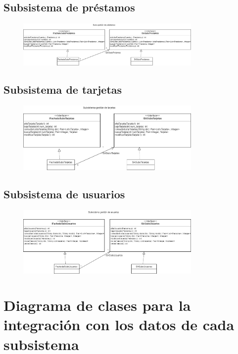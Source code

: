 \documentclass[12pt]{article}
\begin{document}
\subsection{Subsistema de préstamos}
\begin{figure}[H]
    \centering
    \includegraphics[width=0.8\textwidth]{images/SubsPrestamos.png}
\end{figure}
\subsection{Subsistema de tarjetas}
\begin{figure}[H]
    \centering
    \includegraphics[width=0.8\textwidth]{images/SubsTarjeta.png}
\end{figure}
\subsection{Subsistema de usuarios}
\begin{figure}[H]
    \centering
    \includegraphics[width=0.8\textwidth]{images/SubsUsuarios.png}
\end{figure}

\newpage
\section{Diagrama de clases para la integración con los datos de cada subsistema}
\end{document}

